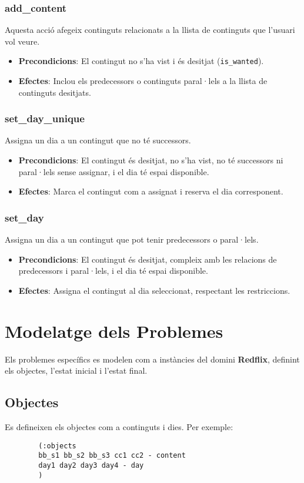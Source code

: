 \documentclass[a4paper]{article}
\begin{document}
	\subsubsection{add\_content}
	Aquesta acció afegeix continguts relacionats a la llista de continguts que l'usuari vol veure.
	\begin{itemize}
		\item \textbf{Precondicions}: El contingut no s'ha vist i és desitjat (\texttt{is\_wanted}).
		\item \textbf{Efectes}: Inclou els predecessors o continguts paral·lels a la llista de continguts desitjats.
	\end{itemize}
	
	\subsubsection{set\_day\_unique}
	Assigna un dia a un contingut que no té successors.
	\begin{itemize}
		\item \textbf{Precondicions}: El contingut és desitjat, no s'ha vist, no té successors ni paral·lels sense assignar, i el dia té espai disponible.
		\item \textbf{Efectes}: Marca el contingut com a assignat i reserva el dia corresponent.
	\end{itemize}
	
	\subsubsection{set\_day}
	Assigna un dia a un contingut que pot tenir predecessors o paral·lels.
	\begin{itemize}
		\item \textbf{Precondicions}: El contingut és desitjat, compleix amb les relacions de predecessors i paral·lels, i el dia té espai disponible.
		\item \textbf{Efectes}: Assigna el contingut al dia seleccionat, respectant les restriccions.
	\end{itemize}
	
	\newpage
	\section{Modelatge dels Problemes}
	Els problemes específics es modelen com a instàncies del domini \textbf{Redflix}, definint els objectes, l'estat inicial i l'estat final.
	
	\subsection{Objectes}
	Es defineixen els objectes com a continguts i dies. Per exemple:
	\begin{verbatim}
		(:objects
		bb_s1 bb_s2 bb_s3 cc1 cc2 - content
		day1 day2 day3 day4 - day
		)
	\end{verbatim}
	
\end{document}
